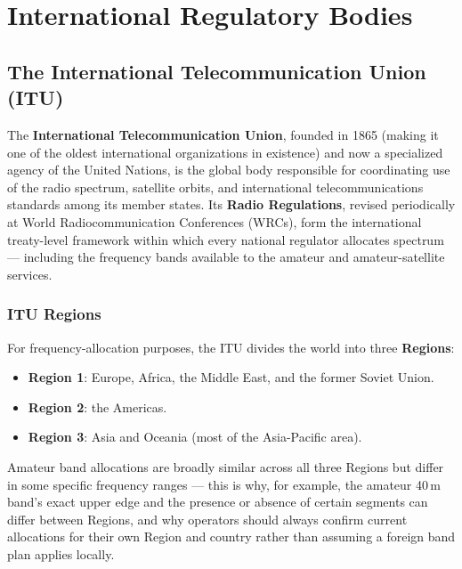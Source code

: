 \chapter{International Regulatory Bodies}
\label{ch:regulatory-bodies}

\section{The International Telecommunication Union (ITU)}

The \textbf{International Telecommunication Union}, founded in 1865
(making it one of the oldest international organizations in existence)
and now a specialized agency of the United Nations, is the global body
responsible for coordinating use of the radio spectrum, satellite
orbits, and international telecommunications standards among its
member states. Its \textbf{Radio Regulations}, revised periodically at
World Radiocommunication Conferences (WRCs), form the international
treaty-level framework within which every national regulator allocates
spectrum --- including the frequency bands available to the amateur and
amateur-satellite services.

\subsection{ITU Regions}


For frequency-allocation purposes, the ITU divides the world into three
\textbf{Regions}:

\begin{itemize}
\item \textbf{Region 1}: Europe, Africa, the Middle East, and the
former Soviet Union.
\item \textbf{Region 2}: the Americas.
\item \textbf{Region 3}: Asia and Oceania (most of the Asia-Pacific
area).
\end{itemize}

Amateur band allocations are broadly similar across all three Regions
but differ in some specific frequency ranges --- this is why, for
example, the amateur 40\,m band's exact upper edge and the presence or
absence of certain segments can differ between Regions, and why
operators should always confirm current allocations for their own
Region and country rather than assuming a foreign band plan applies
locally.

